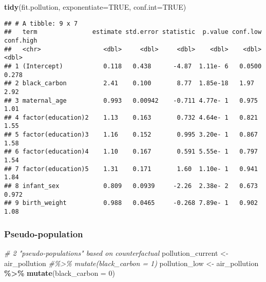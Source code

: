 \documentclass[
]{article}
\newenvironment{Shaded}{\begin{snugshade}}{\end{snugshade}}
\newcommand{\AttributeTok}[1]{\textcolor[rgb]{0.13,0.29,0.53}{#1}}
\newcommand{\CommentTok}[1]{\textcolor[rgb]{0.56,0.35,0.01}{\textit{#1}}}
\newcommand{\ConstantTok}[1]{\textcolor[rgb]{0.56,0.35,0.01}{#1}}
\newcommand{\DecValTok}[1]{\textcolor[rgb]{0.00,0.00,0.81}{#1}}
\newcommand{\FunctionTok}[1]{\textcolor[rgb]{0.13,0.29,0.53}{\textbf{#1}}}
\newcommand{\NormalTok}[1]{#1}
\newcommand{\OtherTok}[1]{\textcolor[rgb]{0.56,0.35,0.01}{#1}}
\newcommand{\SpecialCharTok}[1]{\textcolor[rgb]{0.81,0.36,0.00}{\textbf{#1}}}
\begin{document}
\begin{Shaded}
\begin{Highlighting}[]
\FunctionTok{tidy}\NormalTok{(fit.pollution, }\AttributeTok{exponentiate=}\ConstantTok{TRUE}\NormalTok{, }\AttributeTok{conf.int=}\ConstantTok{TRUE}\NormalTok{)}
\end{Highlighting}
\end{Shaded}

\begin{verbatim}
## # A tibble: 9 x 7
##   term               estimate std.error statistic  p.value conf.low conf.high
##   <chr>                 <dbl>     <dbl>     <dbl>    <dbl>    <dbl>     <dbl>
## 1 (Intercept)           0.118   0.438      -4.87  1.11e- 6   0.0500     0.278
## 2 black_carbon          2.41    0.100       8.77  1.85e-18   1.97       2.92 
## 3 maternal_age          0.993   0.00942    -0.711 4.77e- 1   0.975      1.01 
## 4 factor(education)2    1.13    0.163       0.732 4.64e- 1   0.821      1.55 
## 5 factor(education)3    1.16    0.152       0.995 3.20e- 1   0.867      1.58 
## 6 factor(education)4    1.10    0.167       0.591 5.55e- 1   0.797      1.54 
## 7 factor(education)5    1.31    0.171       1.60  1.10e- 1   0.941      1.84 
## 8 infant_sex            0.809   0.0939     -2.26  2.38e- 2   0.673      0.972
## 9 birth_weight          0.988   0.0465     -0.268 7.89e- 1   0.902      1.08
\end{verbatim}

\subsubsection{Pseudo-population}\label{pseudo-population}

\begin{Shaded}
\begin{Highlighting}[]
\CommentTok{\# 2 "pseudo{-}populations" based on counterfactual}
\NormalTok{pollution\_current }\OtherTok{\textless{}{-}}\NormalTok{ air\_pollution }\CommentTok{\#\%\textgreater{}\% mutate(black\_carbon = 1)}
\NormalTok{pollution\_low }\OtherTok{\textless{}{-}}\NormalTok{  air\_pollution }\SpecialCharTok{\%\textgreater{}\%} \FunctionTok{mutate}\NormalTok{(}\AttributeTok{black\_carbon =} \DecValTok{0}\NormalTok{)}
\end{Highlighting}
\end{Shaded}

\begin{Shaded}
\end{Shaded}
\end{document}
